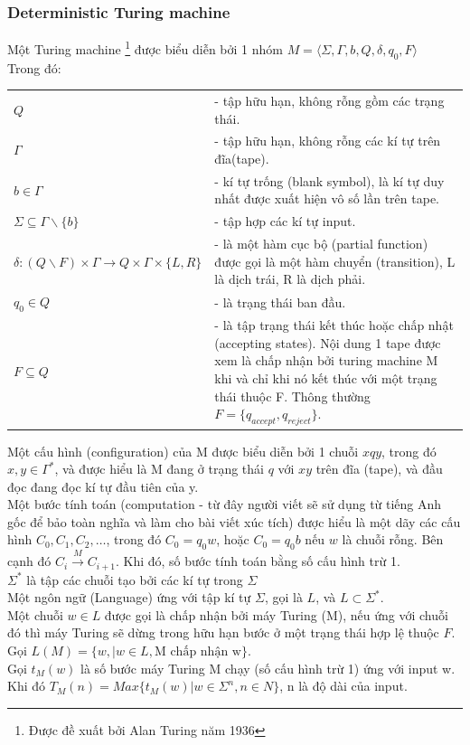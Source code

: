 \documentclass[a4paper 14pt]{article}
\begin{document}
			\subsubsection{Deterministic Turing machine}
				Một Turing machine \footnote{Được đề xuất bởi Alan Turing năm 1936} được biểu diễn bởi 1 nhóm $M = \langle \Sigma, \Gamma, b, Q, \delta, q_0, F \rangle$\\
				Trong đó:\\
				\begin{tabular}{l p{4in}}
					$Q$& - tập hữu hạn, không rỗng gồm các trạng thái.\\
					$\Gamma$& - tập hữu hạn, không rỗng các kí tự trên đĩa(tape).\\
					$b \in \Gamma$& - kí tự trống (blank symbol), là kí tự duy nhất được xuất hiện vô số lần trên tape.\\
					$\Sigma \subseteq \Gamma \backslash \{b\}$& - tập hợp các kí tự input.\\
					$\delta: (Q \backslash F) \times \Gamma \to Q \times \Gamma \times \{L, R\} $& - là một hàm cục bộ (partial function) được gọi là một hàm chuyển (transition), L là dịch trái, R là dịch phải.\\
					$q_{0} \in Q$& - là trạng thái ban đầu.\\
					$F\subseteq Q$& - là tập trạng thái kết thúc hoặc chấp nhật (accepting states). Nội dung 1 tape được xem là chấp nhận bởi turing machine M khi và chỉ khi nó kết thúc với một trạng thái thuộc F. Thông thường $F = \{q_{accept}, q_{reject}\}$.\\
				\end{tabular}  
				Một cấu hình (configuration) của M được biểu diễn bởi 1 chuỗi $xqy$, trong đó $x, y \in \Gamma^{*}$, và được hiểu là M đang ở trạng thái $q$ với $xy$ trên đĩa (tape), và đầu đọc đang đọc kí tự đầu tiên của y.\\
				Một bước tính toán (computation - từ đây người viết sẽ sử dụng từ tiếng Anh gốc để bảo toàn nghĩa và làm cho bài viết xúc tích) được hiểu là một dãy các cấu hình $C_0, C_1, C_2, \hdots$, trong đó $C_0 = q_0w$, hoặc $C_0 = q_0b$ nếu $w$ là chuỗi rỗng. Bên cạnh đó $C_i \overset{M}{\to} C_{i+1}$. Khi đó, số bước tính toán bằng số cấu hình trừ 1.\\
				$\Sigma^*$ là tập các chuỗi tạo bởi các kí tự trong $\Sigma$\\
				Một ngôn ngữ (Language) ứng với tập kí tự $\Sigma$, gọi là $L$, và $L\subset \Sigma^*$.\\
				Một chuỗi $w \in L$ được gọi là chấp nhận bởi máy Turing (M), nếu ứng với chuỗi đó thì máy Turing sẽ dừng trong hữu hạn bước ở một trạng thái hợp lệ thuộc $F$.\\
				Gọi $L(M) = \{w, | w \in L,\text{M chấp nhận w} \}$.\\
				Gọi $t_M(w)$ là số bước máy Turing M chạy (số cấu hình trừ 1) ứng với input w.\\
				Khi đó $T_M(n) = Max\{t_M(w) | w \in \Sigma^n, n \in N\}$, n là độ dài của input. 
\end{document}
